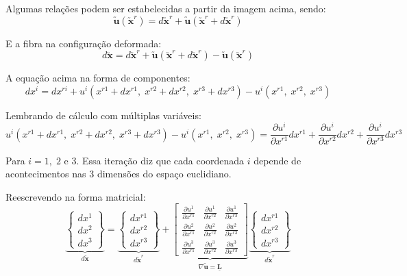 	Algumas relações podem ser estabelecidas a partir da imagem acima, sendo:
	\[\utilde{\mathbf{u}}(\utilde{\mathbf{x}}^r)=d\utilde{\mathbf{x}}^r+\utilde{\mathbf{u}}(\utilde{\mathbf{x}}^r+d\utilde{\mathbf{x}}^r)\]
	
	E a fibra na configuração deformada:	
	\[d\utilde{\mathbf{x}}=d\utilde{\mathbf{x}}^r+\utilde{\mathbf{u}}(\utilde{\mathbf{x}}^r+d\utilde{\mathbf{x}}^r)-\utilde{\mathbf{u}}(\utilde{\mathbf{x}}^r)\]
	
	A equação acima na forma de componentes:
	\[dx^i=dx^{ri}+u^i(x^{r1}+dx^{r1},\;x^{r2}+dx^{r2},\;x^{r3}+dx^{r3})-u^i(x^{r1},\;x^{r2},\;x^{r3})\]
	
	Lembrando de cálculo com múltiplas variáveis:
	\[u^i(x^{r1}+dx^{r1},\;x^{r2}+dx^{r2},\;x^{r3}+dx^{r3})-u^i(x^{r1},\;x^{r2},\;x^{r3})=\frac{\partial u^i}{\partial x^{r1}}dx^{r1}+\frac{\partial u^i}{\partial x^{r2}}dx^{r2}+\frac{\partial u^i}{\partial x^{r3}}dx^{r3}\]
	
	Para $i=1,\;2$ e $3$. Essa iteração diz que cada coordenada $i$ depende de acontecimentos nas $3$ dimensões do espaço euclidiano.
	
	Reescrevendo na forma matricial:
	\[
	\underbrace{
		\begin{Bmatrix}
			dx^1 \\ dx^2 \\ dx^3
		\end{Bmatrix}
		}_{\displaystyle d\utilde{\mathbf{x}}}
		=
		\underbrace{
		\begin{Bmatrix}
			dx^{r1} \\ dx^{r2} \\ dx^{r3}
		\end{Bmatrix}
		}_{\displaystyle d\utilde{\mathbf{x}}^r}
		+
		\underbrace{
		\begin{bmatrix}
			\frac{\partial u^1}{\partial x^{r1}} & \frac{\partial u^1}{\partial x^{r2}} & \frac{\partial u^1}{\partial x^{r3}} \\
			\frac{\partial u^2}{\partial x^{r1}} & \frac{\partial u^2}{\partial x^{r2}} & \frac{\partial u^2}{\partial x^{r3}} \\
			\frac{\partial u^3}{\partial x^{r1}} & \frac{\partial u^3}{\partial x^{r2}} & \frac{\partial u^3}{\partial x^{r3}}
		\end{bmatrix}
		}_{\displaystyle\nabla\utilde{\mathbf{u}}=\underline{\mathbf{L}}}
		\underbrace{
		\begin{Bmatrix}
			dx^{r1} \\ dx^{r2} \\ dx^{r3}
		\end{Bmatrix}
		}_{\displaystyle d\utilde{\mathbf{x}}^r}
	\]
	
